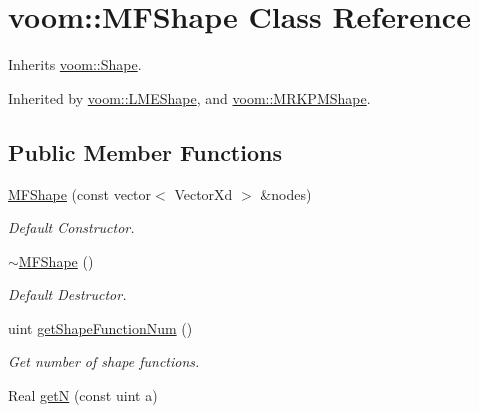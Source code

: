 \hypertarget{classvoom_1_1_m_f_shape}{
\section{voom::MFShape Class Reference}
\label{classvoom_1_1_m_f_shape}
}


Inherits \hyperlink{classvoom_1_1_shape}{voom::Shape}.

Inherited by \hyperlink{classvoom_1_1_l_m_e_shape}{voom::LMEShape}, and \hyperlink{classvoom_1_1_m_r_k_p_m_shape}{voom::MRKPMShape}.\subsection*{Public Member Functions}
\begin{DoxyCompactItemize}
\item 
\hypertarget{classvoom_1_1_m_f_shape_a5a2ba3392f4c0f3b5a7c862588ac5833}{
\hyperlink{classvoom_1_1_m_f_shape_a5a2ba3392f4c0f3b5a7c862588ac5833}{MFShape} (const vector$<$ VectorXd $>$ \&nodes)}
\label{classvoom_1_1_m_f_shape_a5a2ba3392f4c0f3b5a7c862588ac5833}

\begin{DoxyCompactList}\small\item\em Default Constructor. \item\end{DoxyCompactList}\item 
\hypertarget{classvoom_1_1_m_f_shape_a9f471ab24d45af8aa973bdd008254050}{
\hyperlink{classvoom_1_1_m_f_shape_a9f471ab24d45af8aa973bdd008254050}{$\sim$MFShape} ()}
\label{classvoom_1_1_m_f_shape_a9f471ab24d45af8aa973bdd008254050}

\begin{DoxyCompactList}\small\item\em Default Destructor. \item\end{DoxyCompactList}\item 
\hypertarget{classvoom_1_1_m_f_shape_ad731e4d7d6c2f17f659e3172d06123e7}{
uint \hyperlink{classvoom_1_1_m_f_shape_ad731e4d7d6c2f17f659e3172d06123e7}{getShapeFunctionNum} ()}
\label{classvoom_1_1_m_f_shape_ad731e4d7d6c2f17f659e3172d06123e7}

\begin{DoxyCompactList}\small\item\em Get number of shape functions. \item\end{DoxyCompactList}\item 
\hypertarget{classvoom_1_1_m_f_shape_a3541f676547c60640c38325856e4cc27}{
Real \hyperlink{classvoom_1_1_m_f_shape_a3541f676547c60640c38325856e4cc27}{getN} (const uint a)}
\label{classvoom_1_1_m_f_shape_a3541f676547c60640c38325856e4cc27}


\end{DoxyCompactItemize}
